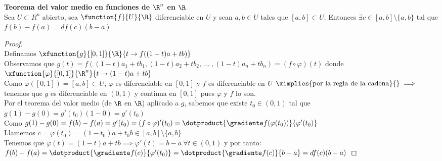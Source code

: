 	\begin{teor} \textbf{Teorema del valor medio en funciones de $\R^n$ en $\R$}\\
	Sea $U\subset R^n$ abierto, sea $\function{f}{U}{\R}$ diferenciable en $U$ y sean $a,b\in U$ tales que $[a,b]\subset U$. Entonces $\exists c\in [a,b]\setminus\{a,b\}$ tal que $f(b)-f(a)=df(c)(b-a)$
	\begin{proof}\ \\
	Definamos $\xfunction{g}{[0,1]}{\R}{t\to f((1-t)a+tb)}$\\
	Observamos que $ g(t)=f((1-t)a_1+tb_1,(1-t)a_2+tb_2,\ ...\ ,(1-t)a_n+tb_n)=(f\circ\varphi)(t)$ donde $\xfunction{\varphi}{[0,1]}{\R^n}{t\to (1-t)a+tb}$\\
	Como $\varphi([0,1])=[a,b]\subset U$, $\varphi$ es diferenciable en $[0,1]$ y $f$ es diferenciable en $U\ \ximplies{\mathrm{por\ la \ regla\ de\ la\ cadena}}{}\\ \implies$ tenemos que $g$ es diferenciable en $(0,1)$ y continua en $[0,1]$ pues $\varphi$ y $f$ lo son.\\
	Por el teorema del valor medio (de $\R$ en $\R$) aplicado a $g$, sabemos que existe $t_0\in (0,1)$ tal que $g(1)-g(0)=g'(t_0)(1-0)=g'(t_0)$\\
	Como $g(1)-g(0)=f(b)-f(a)=g'(t_0)=(f\circ\varphi)'(t_0)=\dotproduct{\gradiente f(\varphi(t_0))}{\varphi'(t_0)}$\\
	Llamemos $c=\varphi(t_0)=(1-t_0)a+t_0b\in [a,b]\setminus\{a,b\}$\\
	Tenemos que  $\varphi(t)=(1-t)a+tb\implies \varphi'(t)=b-a\ \forall t\in (0,1)$ y por tanto:\\
	$f(b)-f(a)=\dotproduct{\gradiente f(c)}{\varphi'(t_0)}=\dotproduct{\gradiente f(c)}{b-a}=df(c)(b-a)$
	\end{proof}
	\end{teor}
	
